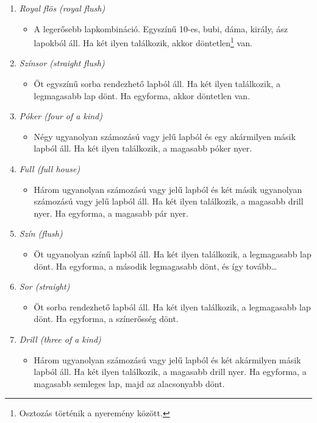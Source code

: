 \documentclass[]{thesis-ekf}
\theoremstyle{definition}
\theoremstyle{remark}
\begin{document}
\begin{enumerate}
	\item \emph{Royal flös (royal flush)}
	\begin{itemize}
		\item A legerősebb lapkombináció. Egyszínű 10-es, bubi, dáma, király, ász lapokból áll. Ha két ilyen találkozik, akkor döntetlen\footnote{Osztozás történik a nyeremény között.} van.
	\end{itemize}
	\item \emph{Színsor (straight flush)}
	\begin{itemize}
		\item Öt egyszínű sorba rendezhető lapból áll. Ha két ilyen találkozik, a legmagasabb lap dönt. Ha egyforma, akkor döntetlen van. 
	\end{itemize}
	\item \emph{Póker (four of a kind)}
	\begin{itemize}
		\item Négy ugyanolyan számozású vagy jelű lapból és egy akármilyen másik lapból áll. Ha két ilyen találkozik, a magasabb póker nyer.
	\end{itemize}
	\item \emph{Full (full house)}
	\begin{itemize}
		\item Három ugyanolyan számozású vagy jelű lapból és két másik ugyanolyan számozású vagy jelű lapból áll. Ha két ilyen találkozik, a magasabb drill nyer. Ha egyforma, a magasabb pár nyer.
	\end{itemize}
	\item \emph{Szín (flush)}
	\begin{itemize}
		\item Öt ugyanolyan színű lapból áll. Ha két ilyen találkozik, a legmagasabb lap dönt. Ha egyforma, a második legmagasabb dönt, és így tovább\dots
	\end{itemize}
	\item \emph{Sor (straight)}
	\begin{itemize}
		\item Öt sorba rendezhető lapból áll. Ha két ilyen találkozik, a legmagasabb lap dönt. Ha egyforma, a színerősség dönt.
	\end{itemize}
	\item \emph{Drill (three of a kind)}
	\begin{itemize}
		\item Három ugyanolyan számozású vagy jelű lapból és két akármilyen másik lapból áll. Ha két ilyen találkozik, a magasabb drill nyer. Ha egyforma, a magasabb semleges lap, majd az alacsonyabb dönt.

\end{itemize}
\end{enumerate}
\end{document}
